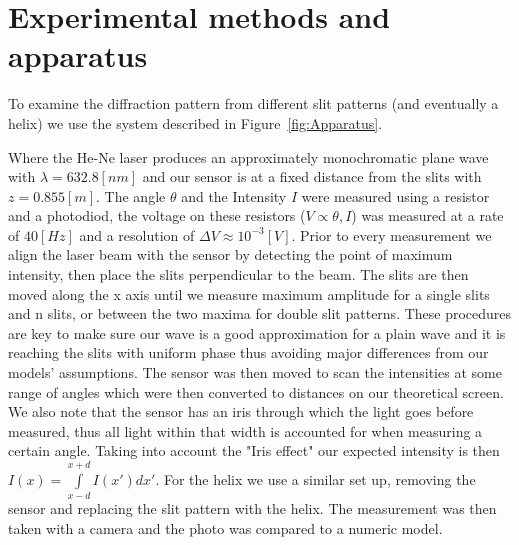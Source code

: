 \section{Experimental methods and apparatus}\label{sec:experimental-technique-and-apparatus}
To examine the diffraction pattern from different slit patterns (and eventually a helix) we use the system described in Figure~\ref{fig:Apparatus}.

Where the He-Ne laser produces an approximately monochromatic plane wave with $\lambda=632.8 [nm]$ and our sensor is at a fixed distance from the slits with $z=0.855 [m]$.
The angle $\theta$ and the Intensity $I$ were measured using a resistor and a photodiod, the voltage on these resistors ($V\propto\theta,I$) was
measured at a rate of $40[Hz]$ and a resolution of $\Delta V\approx10^{-3}[V]$.
Prior to every measurement we align the laser beam with the sensor by detecting the point of maximum intensity, then place the slits perpendicular to
the beam.
The slits are then moved along the x axis until we measure maximum amplitude for a single slits and n slits, or between the two maxima for double slit patterns.
These procedures are key to make sure our wave is a good approximation for a plain wave and it is reaching the slits with uniform phase thus avoiding major differences from our models' assumptions.
The sensor was then moved to scan the intensities at some range of angles which were then converted to distances on our theoretical screen.
We also note that the sensor has an iris through which the light goes before measured, thus all light within that width is accounted for when measuring a
certain angle.
Taking into account the "Iris effect" our expected intensity is then $I(x)=\int\limits_{x-d}^{x+d}I(x')dx'$.
For the helix we use a similar set up, removing the sensor and replacing the slit pattern with the helix.
The measurement was then taken with a camera and the photo was compared to a numeric model.